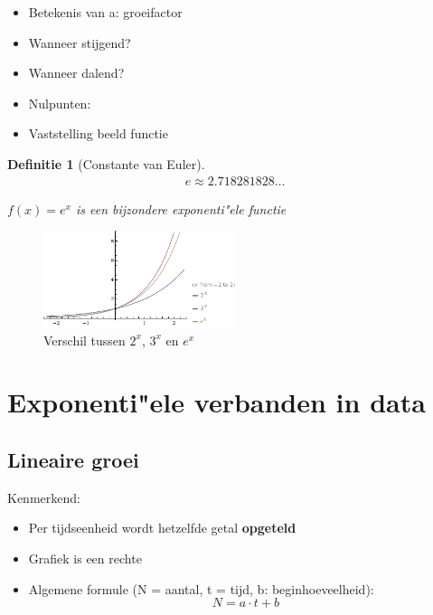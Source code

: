 \documentclass{article}
\newtheorem{theorem}{Definitie}[section]
\begin{document}
\begin{itemize}
    \item Betekenis van a: groeifactor
    \item Wanneer stijgend? 
    \item Wanneer dalend? 
    \item Nulpunten: 
    \item Vaststelling beeld functie
\end{itemize}



\begin{theorem}[Constante van Euler]

\begin{equation}
    \begin{aligned}
        e \approx 2.718281828\dots
    \end{aligned}
\end{equation}

$f(x) = e^x$ is een bijzondere exponenti"ele functie
\end{theorem}

\begin{figure}[H]
    \centering
    \includegraphics[width=0.5\textwidth]{functie-exponentieel3.png}
    \caption{Verschil tussen $2^x$, $3^x$ en $e^x$}
\end{figure}

\section{Exponenti"ele verbanden in data}

\subsection{Lineaire groei}

Kenmerkend:

\begin{itemize}
    \item Per tijdseenheid wordt hetzelfde getal \textbf{opgeteld}
    \item Grafiek is een rechte
    \item Algemene formule (N = aantal, t = tijd, b: beginhoeveelheid): 
    \begin{equation}
        N = a\cdot t + b
    \end{equation}
\end{itemize}
\end{document}
